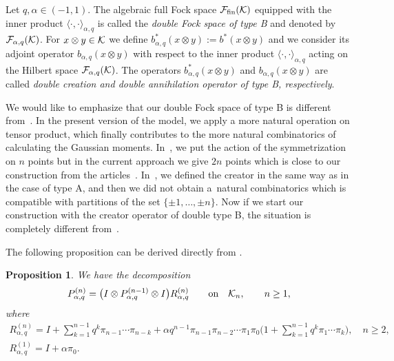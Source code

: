 \documentclass[pdftex]{sigma}
\numberwithin{equation}{section}
\newtheorem{Proposition}[Theorem]{Proposition}
 { \theoremstyle{definition}
\newtheorem{Definition}[Theorem]{Definition}
\newtheorem{Note}[Theorem]{Note}
\newtheorem{Example}[Theorem]{Example}
\newtheorem{Remark}[Theorem]{Remark} }
\def\B{b_{\s,\q}}
\def\r{b}
\def\F{\mathcal{F}_{\rm fin}(\HH)}
\def\id{I}
\def\H{{\bf \mathcal K}_{ n}}
\def\HH{{\bf \mathcal K}}
\newcommand{\q}{q}
\newcommand{\s}{\alpha}%
\begin{document}
\begin{Definition} Let $\q,\s \in (-1,1)$. The algebraic full Fock space $\F$ equipped with the inner product $\langle\cdot,\cdot \rangle_{\s,\q}$ is called the \emph{double Fock space of type B} and denoted by $\mathcal{F}_{\s,\q}(\HH)$.
	For $x\otimes y \in \HH$ we define $\B^\ast(x\otimes y):=
	\r^\ast(x\otimes y)$ and we consider its adjoint operator $\B(x\otimes
	y)$ with
	respect to the inner product $\langle\cdot,\cdot \rangle_{\s,\q}$
	acting on the Hilbert space $\mathcal{F}_{\s,\q}(\HH)$. The operators $\B^\ast(x\otimes y)$ and $\B(x\otimes y)$ are called \emph{double creation and double annihilation operator of type B, respectively}.
\end{Definition}

\begin{Remark}
We would like to emphasize that our double Fock space of type B is different from~\cite{BozejkoEjsmontHasebe2015}.
	In the present version of the model, we apply a more natural operation on tensor product, which finally contributes to the more natural combinatorics of calculating the Gaussian moments.
	In~\cite{BozejkoEjsmontHasebe2015}, we put the action of the symmetrization on $n$ points but in the current ap\-proach we give $2n$ points which is close to our construction from the articles~\cite{BDEG2021,Ejsmont2020}. In~\cite{BozejkoEjsmontHasebe2015}, we defined the creator in the same way as in the case of type A, and then we did not obtain a~natural combinatorics which is compatible with partitions of the set $\{\pm 1,\dots, \pm n\}$.
	Now if we start our construction with the creator operator of double type B, the situation is completely different from~\cite{BozejkoEjsmontHasebe2015}.
\end{Remark}
The following proposition can be derived directly
from \cite[Proposition 2.3]{BozejkoEjsmontHasebe2015}.

\begin{Proposition}%
We have the decomposition
\begin{equation*}%
P^{(n)}_{\s,\q}=\big( \id \otimes P^{(n-1)}_{\s,\q}\otimes \id \big)R^{(n)}_{\s,\q}\qquad \text{on}\quad \H, \qquad n\geq 1,
\end{equation*}
where\vspace{-2mm}
\begin{gather*}
R^{(n)}_{\s,\q} = \id+\sum_{k=1}^{n-1}\q^{k}\pi_{n-1}\cdots \pi_{n-k} + \s \q^{n-1}\pi_{n-1} \pi_{n-2} \cdots \pi_{1}\pi_0\bigg(1+\sum_{k=1}^{n-1}\q^{k}\pi_{1}\cdots \pi_{k}\bigg), \quad n\geq 2,
\\
R^{(1)}_{\s,\q} =\id+\s\pi_0.%
\end{gather*}
\end{Proposition}
\end{document}
